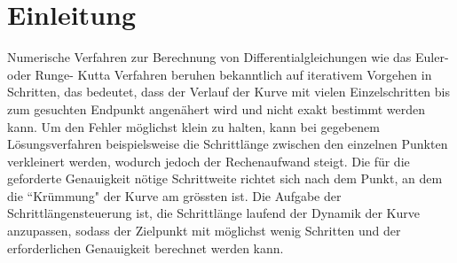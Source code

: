 %
%
%
\section{Einleitung\label{steps:section:einleitung}}

Numerische Verfahren zur Berechnung von Differentialgleichungen wie das Euler- oder Runge-
Kutta Verfahren beruhen bekanntlich auf iterativem Vorgehen in Schritten, das bedeutet, dass der Verlauf
der Kurve mit vielen Einzelschritten bis zum gesuchten Endpunkt angenähert wird und nicht exakt
bestimmt werden kann. Um den Fehler möglichst klein zu halten,
kann bei gegebenem Lösungsverfahren beispielsweise die Schrittlänge zwischen den einzelnen Punkten verkleinert werden, wodurch
jedoch der Rechenaufwand steigt. Die für die geforderte Genauigkeit nötige Schrittweite richtet sich
nach dem Punkt, an dem die ``Krümmung" der Kurve am grössten ist. Die Aufgabe der Schrittlängensteuerung ist,
die Schrittlänge laufend der Dynamik der Kurve anzupassen, sodass der
Zielpunkt mit möglichst wenig Schritten und der erforderlichen Genauigkeit berechnet werden
kann.


